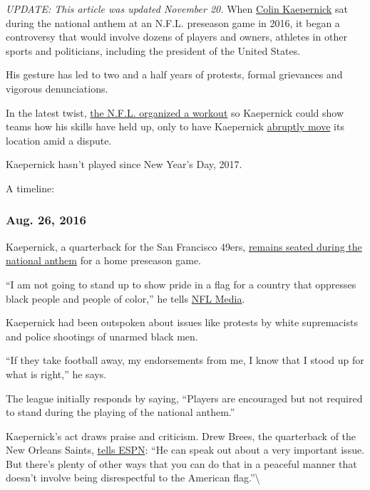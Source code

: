 \emph{UPDATE: This article was updated November 20.} When
\href{https://www.nytimes.com/2020/06/12/sports/football/nfl-protest-colin-kaepernick-activism.html}{Colin
Kaepernick} sat during the national anthem at an N.F.L. preseason game
in 2016, it began a controversy that would involve dozens of players and
owners, athletes in other sports and politicians, including the
president of the United States.

His gesture has led to two and a half years of protests, formal
grievances and vigorous denunciations.

In the latest twist,
\href{https://www.nytimes.com/2019/11/12/sports/football/colin-kaepernick-nfl-workout.html}{the
N.F.L. organized a workout} so Kaepernick could show teams how his
skills have held up, only to have Kaepernick
\href{https://www.nytimes.com/2019/11/16/sports/football/colin-kaepernick-nfl-workout.html}{abruptly
move} its location amid a dispute.

Kaepernick hasn't played since New Year's Day, 2017.

A timeline:

\hypertarget{aug-26-2016}{%
\subsubsection{\texorpdfstring{\textbf{Aug. 26,
2016}}{Aug. 26, 2016}}\label{aug-26-2016}}

Kaepernick, a quarterback for the San Francisco 49ers,
\href{https://www.nytimes.com/2016/08/28/sports/football/colin-kaepernick-national-anthem-49ers-stand.html}{remains
seated during the national anthem} for a home preseason game.

``I am not going to stand up to show pride in a flag for a country that
oppresses black people and people of color,'' he tells
\href{http://www.nfl.com/news/story/0ap3000000691077/article/colin-kaepernick-explains-protest-of-national-anthem}{NFL
Media}.

Kaepernick had been outspoken about issues like protests by white
supremacists and police shootings of unarmed black men.

``If they take football away, my endorsements from me, I know that I
stood up for what is right,'' he says.

The league initially responds by saying, ``Players are encouraged but
not required to stand during the playing of the national anthem.''

Kaepernick's act draws praise and criticism. Drew Brees, the quarterback
of the New Orleans Saints,
\href{http://www.espn.com/blog/new-orleans-saints/post/_/id/23063/drew-brees-wholeheartedly-disagrees-with-colin-kaepernicks-method-of-protest}{tells
ESPN}: ``He can speak out about a very important issue. But there's
plenty of other ways that you can do that in a peaceful manner that
doesn't involve being disrespectful to the American
flag.''\textbackslash{}

